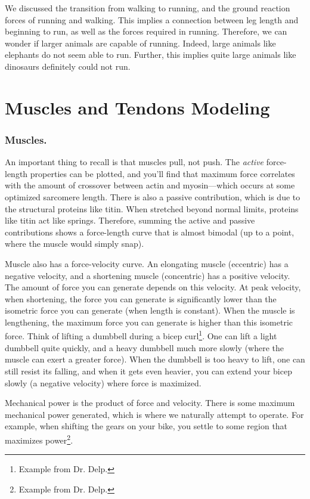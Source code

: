 We discussed the transition from walking to running, and the ground reaction forces of running and walking. This implies a connection between leg length and beginning to run, as well as the forces required in running. Therefore, we can wonder if larger animals are capable of running. Indeed, large animals like elephants do not seem able to run. Further, this implies quite large animals like dinosaurs definitely could not run. 


\section{Muscles and Tendons Modeling}

\subsubsection{Muscles.}

An important thing to recall is that muscles pull, not push. The \textit{active} force-length properties can be plotted, and you'll find that maximum force correlates with the amount of crossover between actin and myosin---which occurs at some optimized sarcomere length. There is also a passive contribution, which is due to the structural proteins like titin. When stretched beyond normal limits, proteins like titin act like springs. Therefore, summing the active and passive contributions shows a force-length curve that is almost bimodal (up to a point, where the muscle would simply snap).\newline

Muscle also has a force-velocity curve. An elongating muscle (eccentric) has a negative velocity, and a shortening muscle (concentric) has a positive velocity. The amount of force you can generate depends on this velocity. At peak velocity, when shortening, the force you can generate is significantly lower than the isometric force you can generate (when length is constant). When the muscle is lengthening, the maximum force you can generate is higher than this isometric force. Think of lifting a dumbbell during a bicep curl\footnote{Example from Dr. Delp.}. One can lift a light dumbbell quite quickly, and a heavy dumbbell much more slowly (where the muscle can exert a greater force). When the dumbbell is too heavy to lift, one can still resist its falling, and when it gets even heavier, you can extend your bicep slowly (a negative velocity) where force is maximized.\newline

Mechanical power is the product of force and velocity. There is some maximum mechanical power generated, which is where we naturally attempt to operate. For example, when shifting the gears on your bike, you settle to some region that maximizes power\footnote{Example from Dr. Delp.}. 

